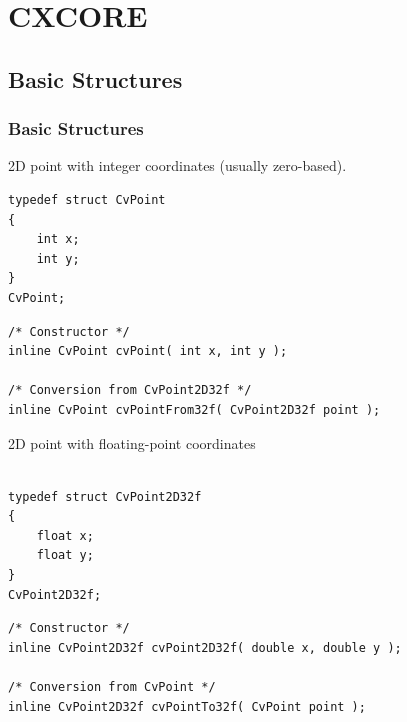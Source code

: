 \chapter{CXCORE}

\section{Basic Structures}

\subsection{Basic Structures}

\label{CvPoint}

2D point with integer coordinates (usually zero-based).

\begin{lstlisting}
typedef struct CvPoint
{
    int x; 
    int y; 
}
CvPoint;
\end{lstlisting}

\begin{description}
\end{description}

\begin{lstlisting}
/* Constructor */
inline CvPoint cvPoint( int x, int y );

/* Conversion from CvPoint2D32f */
inline CvPoint cvPointFrom32f( CvPoint2D32f point );
\end{lstlisting}


\label{CvPoint2D32f}

2D point with floating-point coordinates

\begin{lstlisting}

typedef struct CvPoint2D32f
{
    float x;
    float y; 
}
CvPoint2D32f;
\end{lstlisting}

\begin{description}
\end{description}

\begin{lstlisting}
/* Constructor */
inline CvPoint2D32f cvPoint2D32f( double x, double y );

/* Conversion from CvPoint */
inline CvPoint2D32f cvPointTo32f( CvPoint point );

\end{lstlisting}


